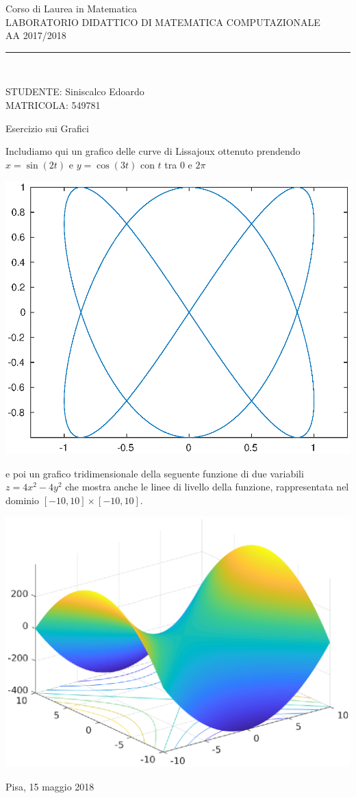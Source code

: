 \documentclass[a4paper,10pt]{article}
\begin{document}
\thispagestyle{empty}
{\centering
Corso di Laurea in Matematica \\
LABORATORIO DIDATTICO DI MATEMATICA COMPUTAZIONALE \\
AA 2017/2018   \\
 \rule{6cm}{1pt} \\
} 
\vspace{0.3cm} \noindent
STUDENTE: Siniscalco Edoardo \\
MATRICOLA: 549781 \\

\begin{center} 
Esercizio sui Grafici \end{center}

Includiamo qui un grafico delle curve di Lissajoux ottenuto prendendo $x = \sin(2t)$ e $y = \cos(3t)$ con $t$ tra $0$ e $2\pi$

\begin{center}
\includegraphics[scale=0.4]{fig1.eps} \end{center}

e poi un grafico tridimensionale della seguente funzione di due variabili $z = 4x^2 - 4y^2$ che mostra anche le linee di livello della funzione, rappresentata nel dominio $[-10,10] \times [-10, 10]$.

\begin{center}
\includegraphics[scale=0.5]{fig2.eps} \end{center}

Pisa, 15 maggio 2018
\end{document}
